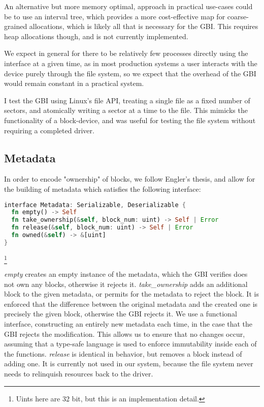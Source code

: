 \documentclass[letterpaper,twocolumn,10pt]{article}
\begin{document}
An alternative but more memory optimal, approach in practical use-cases could be to use an
interval tree, which provides a more cost-effective map for coarse-grained allocations, which is
likely all that is necessary for the GBI. This requires heap allocations though, and is not
currently implemented.

We expect in general for there to be relatively few processes directly using the interface at a
given time, as in most production systems a user interacts with the device purely through the
file system, so we expect that the overhead of the GBI would remain constant in a practical
system.

I test the GBI using Linux's file API, treating a single file as a fixed number of sectors, and
atomically writing a sector at a time to the file. This mimicks the functionality of a
block-device, and was useful for testing the file system without requiring a completed driver.

\subsection{Metadata}

In order to encode "ownership" of blocks, we follow Engler's thesis, and allow for the building
of metadata which satisfies the following interface:
\begin{lstlisting}[language=rust, basicstyle=\small]
interface Metadata: Serializable, Deserializable {
  fn empty() -> Self
  fn take_ownership(&self, block_num: uint) -> Self | Error
  fn release(&self, block_num: uint) -> Self | Error
  fn owned(&self) -> &[uint]
}
\end{lstlisting}\footnote{Uints here are 32 bit, but this is an implementation detail.}

\textit{empty} creates an empty instance of the metadata, which the GBI verifies does not own
any blocks, otherwise it rejects it. \textit{take\_ownership} adds an additional block to the
given metadata, or permits for the metadata to reject the block. It is enforced that the
difference between the original metadata and the created one is precisely the given block,
otherwise the GBI rejects it. We use a functional interface, constructing an entirely new
metadata each time, in the case that the GBI rejects the modification. This allows us to ensure
that no changes occur, assuming that a type-safe language is used to enforce immutability
inside each of the functions. \textit{release} is identical in behavior, but removes a block
instead of adding one. It is currently not used in our system, because the file system never
needs to relinquish resources back to the driver.
\end{document}
